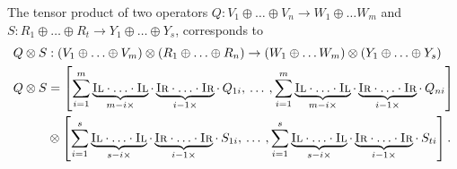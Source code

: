  
The tensor product of two operators $Q: V_1 \oplus \ldots \oplus V_n \rightarrow W_1  \oplus \ldots W_m $ and $S: R_1 \oplus \ldots \oplus R_t \rightarrow Y_1 \oplus \ldots \oplus Y_s$, corresponds to 
\begin{equation}
  \begin{split}
    Q \otimes S &:  (V_1 \oplus \ldots \oplus V_m) \otimes  (R_1 \oplus \ldots \oplus R_n)  \rightarrow  (W_1  \oplus \ldots W_m) \otimes  (Y_1 \oplus \ldots \oplus Y_s)\\
     Q \otimes S &= \left[ \sum_{i=1}^{m} \underbrace{\textsc{Il} \cdot \ldots \cdot \textsc{Il}}_{m-i \times } \cdot  \underbrace{\textsc{Ir} \cdot \ldots \cdot \textsc{Ir}}_{i-1 \times } \cdot  \hspace{2pt} Q_{1i},  \hspace{2pt} \ldots  \hspace{2pt}, \sum_{i=1}^{m} \underbrace{\textsc{Il} \cdot \ldots \cdot \textsc{Il}}_{m-i \times } \cdot  \underbrace{\textsc{Ir} \cdot \ldots \cdot \textsc{Ir}}_{i-1 \times } \cdot  \hspace{2pt} Q_{ni}  \right]  \\ 
    &  \otimes \left[ \sum_{i=1}^{s} \underbrace{\textsc{Il} \cdot \ldots \cdot \textsc{Il}}_{s-i \times } \cdot  \underbrace{\textsc{Ir} \cdot \ldots \cdot \textsc{Ir}}_{i-1 \times } \cdot  \hspace{2pt} S_{1i},  \hspace{2pt} \ldots  \hspace{2pt}, \sum_{i=1}^{s} \underbrace{\textsc{Il} \cdot \ldots \cdot \textsc{Il}}_{s-i \times } \cdot  \underbrace{\textsc{Ir} \cdot \ldots \cdot \textsc{Ir}}_{i-1 \times } \cdot  \hspace{2pt} S_{ti}  \right]. \\
  \end{split}
\end{equation}

